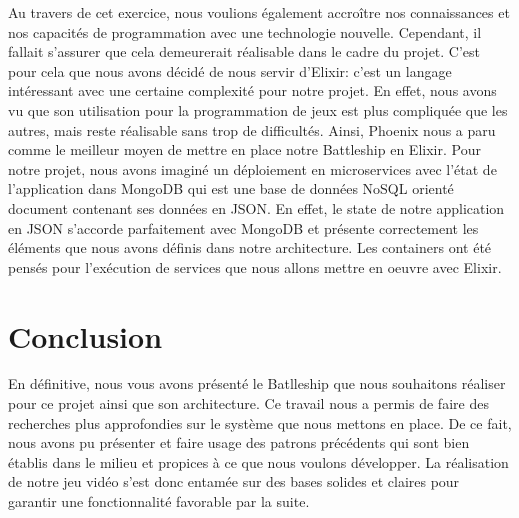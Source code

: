 \documentclass[12pt]{article}
\begin{document}
Au travers de cet exercice, nous voulions également accroître nos connaissances et nos capacités de programmation avec une technologie nouvelle. Cependant, il fallait s'assurer que cela demeurerait réalisable dans le cadre du projet. C'est pour cela que nous avons décidé de nous servir d'Elixir: c'est un langage intéressant avec une certaine complexité pour notre projet. En effet, nous avons vu que son utilisation pour la programmation de jeux est plus compliquée que les autres, mais reste réalisable sans trop de difficultés.
Ainsi, Phoenix nous a paru comme le meilleur moyen de mettre en place notre Battleship en Elixir.
Pour notre projet, nous avons imaginé un déploiement en microservices avec l'état de l'application dans MongoDB qui est une base de données NoSQL orienté document contenant ses données en JSON. En effet, le state de notre application en JSON s'accorde parfaitement avec MongoDB et présente correctement les éléments que nous avons définis dans notre architecture. Les containers ont été pensés pour l'exécution de services que nous allons mettre en oeuvre avec Elixir.

\section{Conclusion}

En définitive, nous vous avons présenté le Batlleship que nous souhaitons réaliser pour ce projet ainsi que son architecture. Ce travail nous a permis de faire des recherches plus approfondies sur le système que nous mettons en place. De ce fait, nous avons pu présenter et faire usage des patrons précédents qui sont bien établis dans le milieu et propices à ce que nous voulons développer. La réalisation de notre jeu vidéo s'est donc entamée sur des bases solides et claires pour garantir une fonctionnalité favorable par la suite.

\newpage


\end{document}
